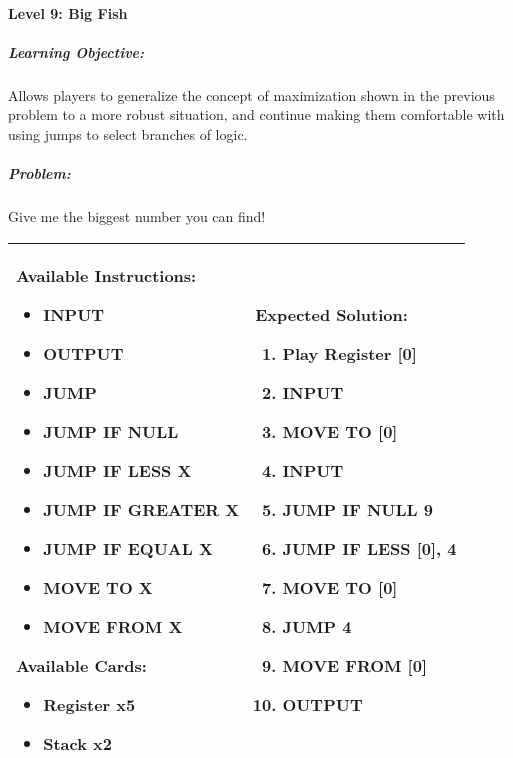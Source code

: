 \paragraph{Level 9: Big Fish}
\subparagraph{Learning Objective:} Allows players to generalize the concept of maximization shown in the previous problem to a more robust situation, and continue making them comfortable with using jumps to select branches of logic.

\subparagraph{Problem:} Give me the biggest number you can find!

\begin{center}
    \begin{tabular}{ | m{6cm} | m{8cm} | } 
        \hline
            \textbf{Available Instructions:} 
            \begin{itemize}
                \setlength\itemsep{-.35em}
                \item INPUT
                \item OUTPUT
                \item JUMP
                \item JUMP IF NULL
                \item JUMP IF LESS X
                \item JUMP IF GREATER X
	     \item JUMP IF EQUAL X
                \item MOVE TO X
                \item MOVE FROM X
            \end{itemize}
            \textbf{Available Cards:} 
            \begin{itemize}
                \setlength\itemsep{-.35em}
                \item Register x5
                \item Stack x2
            \end{itemize}& 
            \textbf{Expected Solution:} 
            \begin{enumerate}
                \setlength\itemsep{-.35em}
                \item Play Register [0]
                \item INPUT
                \item MOVE TO [0]
                \item INPUT
                \item JUMP IF NULL 9
                \item JUMP IF LESS [0], 4
                \item MOVE TO [0]
                \item JUMP 4
                \item MOVE FROM [0]
                \item OUTPUT
            \end{enumerate}
            \\
        \hline
    \end{tabular}
\end{center}


